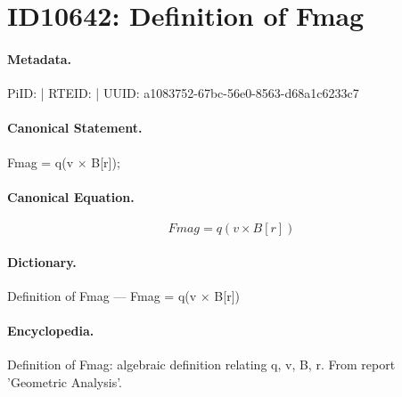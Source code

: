 \section*{ID10642: Definition of Fmag}
\paragraph{Metadata.}
PiID:  | RTEID:  | UUID: a1083752-67bc-56e0-8563-d68a1c6233c7

\paragraph{Canonical Statement.}
Fmag = q(v × B[r]);

\paragraph{Canonical Equation.}
\[
Fmag = q(v × B[r])
\]

\paragraph{Dictionary.}
Definition of Fmag — Fmag = q(v × B[r])

\paragraph{Encyclopedia.}
Definition of Fmag: algebraic definition relating q, v, B, r. From report 'Geometric Analysis'.
